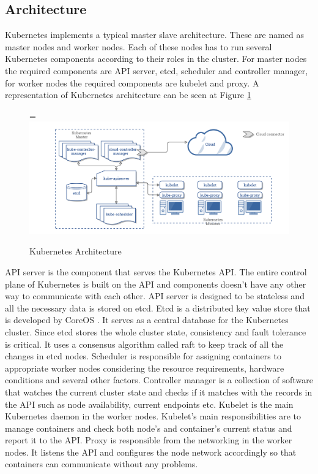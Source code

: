 \documentclass[12pt,oneandhalf,chaparabic,ceng,ms,eng,oneside,pntc]{gsufbe}
\makeatletter
\let\old@includegraphics\includegraphics
\renewcommand{\includegraphics}[2][,]{%
  \setbox9=\hbox{\old@includegraphics[#1]{#2}}%
  \ifdim\wd9>\textwidth
    \old@includegraphics[#1,width=\textwidth]{#2}%
  \else
    \old@includegraphics[#1]{#2}%
  \fi%
}
\makeatother
\begin{document}
\subsection{Architecture}
Kubernetes implements a typical master slave architecture. These are named as master nodes and worker
nodes. Each of these nodes has to run several Kubernetes components according to their roles in the
cluster. For master nodes the required components are API server, etcd, scheduler and
controller manager, for worker nodes the required components are kubelet and proxy. A representation
of Kubernetes architecture can be seen at Figure \ref{fig:k8sarch}

\begin{figure}
\centering
\includegraphics[]{k8s-arch.png}
\caption{Kubernetes Architecture \cite{kube_arch}}
\label{fig:k8sarch}
\end{figure}

API server is the component that serves the Kubernetes API. The entire control plane of Kubernetes is
built on the API and components doesn't have any other way to communicate with each other. API server
is designed to be stateless and all the necessary data is stored on etcd.
Etcd is a distributed key value store that is developed by CoreOS \cite{coreos}. It serves as a central database for
the Kubernetes cluster. Since etcd stores the whole cluster state, consistency and fault tolerance is
critical. It uses a consensus algorithm called raft \cite{raft} to keep track of all the changes in etcd nodes.
Scheduler is responsible for assigning containers to appropriate worker nodes considering the resource
requirements, hardware conditions and several other factors.
Controller manager is a collection of software that watches the current cluster state and checks if it
matches with the records in the API such as node availability, current endpoints etc.
Kubelet is the main Kubernetes daemon in the worker nodes. Kubelet's main responsibilities are to 
manage containers and check both node's and container's current status and report it to the API.
Proxy is responsible from the networking in the worker nodes. It listens the API and configures the
node network accordingly so that containers can communicate without any problems.
\end{document}
